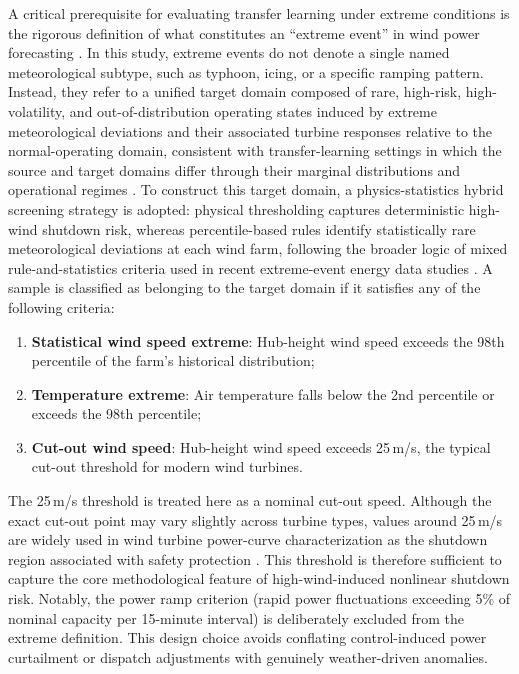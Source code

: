 \documentclass[a4paper]{cas-sc}
\begin{document}
A critical prerequisite for evaluating transfer learning under extreme conditions is the rigorous definition of what constitutes an ``extreme event'' in wind power forecasting \citep{sideratos2012extreme, liu2024extreme}. In this study, extreme events do not denote a single named meteorological subtype, such as typhoon, icing, or a specific ramping pattern. Instead, they refer to a unified target domain composed of rare, high-risk, high-volatility, and out-of-distribution operating states induced by extreme meteorological deviations and their associated turbine responses relative to the normal-operating domain, consistent with transfer-learning settings in which the source and target domains differ through their marginal distributions and operational regimes \citep{pan2010survey, bendavid2010theory}. To construct this target domain, a physics-statistics hybrid screening strategy is adopted: physical thresholding captures deterministic high-wind shutdown risk, whereas percentile-based rules identify statistically rare meteorological deviations at each wind farm, following the broader logic of mixed rule-and-statistics criteria used in recent extreme-event energy data studies \citep{liu2023eweld}. A sample is classified as belonging to the target domain if it satisfies any of the following criteria:

\begin{enumerate}
    \item \textbf{Statistical wind speed extreme}: Hub-height wind speed exceeds the 98th percentile of the farm's historical distribution;
    \item \textbf{Temperature extreme}: Air temperature falls below the 2nd percentile or exceeds the 98th percentile;
    \item \textbf{Cut-out wind speed}: Hub-height wind speed exceeds 25\,m/s, the typical cut-out threshold for modern wind turbines.
\end{enumerate}

The 25\,m/s threshold is treated here as a nominal cut-out speed. Although the exact cut-out point may vary slightly across turbine types, values around 25\,m/s are widely used in wind turbine power-curve characterization as the shutdown region associated with safety protection \citep{rabanal2019midas}. This threshold is therefore sufficient to capture the core methodological feature of high-wind-induced nonlinear shutdown risk. Notably, the power ramp criterion (rapid power fluctuations exceeding 5\% of nominal capacity per 15-minute interval) is deliberately excluded from the extreme definition. This design choice avoids conflating control-induced power curtailment or dispatch adjustments with genuinely weather-driven anomalies.
\end{document}

